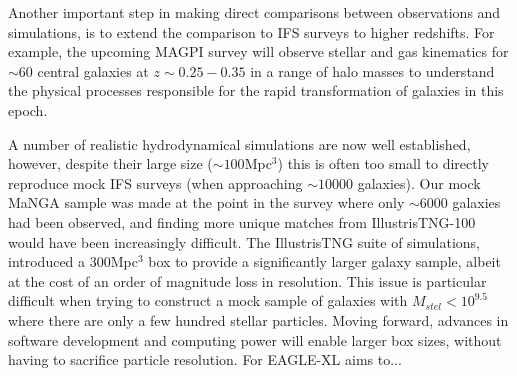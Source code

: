 Another important step in making direct comparisons between observations and simulations, is to extend the comparison to IFS surveys to higher redshifts. For example, the upcoming MAGPI survey will observe stellar and gas kinematics for $\sim 60$ central galaxies at $z\sim0.25-0.35$ in a range of halo masses to understand the physical processes responsible for the rapid transformation of galaxies in this epoch. 

A number of realistic hydrodynamical simulations are now well established, however, despite their large size ($\sim 100$Mpc$^3$) this is often too small to directly reproduce mock IFS surveys (when approaching $\sim 10000$ galaxies). Our mock MaNGA sample was made at the point in the survey where only $\sim$6000 galaxies had been observed, and finding more unique matches from IllustrisTNG-100 would have been increasingly difficult. The IllustrisTNG suite of simulations, introduced a 300Mpc$^3$ box to provide a significantly larger galaxy sample, albeit at the cost of an order of magnitude loss in resolution. This issue is particular difficult when trying to construct a mock sample of galaxies with $M_{stel} < 10^{9.5}$ where there are only a few hundred stellar particles. Moving forward, advances in software development and computing power will enable larger box sizes, without having to sacrifice particle resolution. For EAGLE-XL aims to... 
